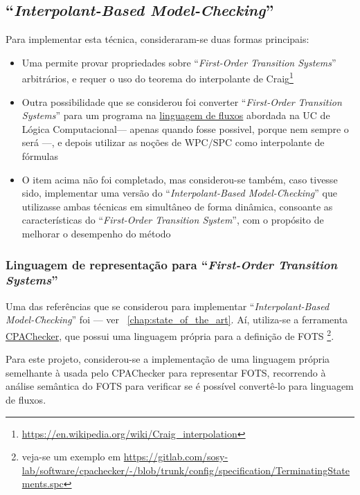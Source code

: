 \documentclass[11pt,a4paper]{report}%
\def\imc{``\textit{Interpolant-Based Model-Checking}''\xspace}
\def\fotss{``\textit{First-Order Transition Systems}''\xspace}
\def\fots{``\textit{First-Order Transition System}''\xspace}
\def\lc{Lógica Computacional}
\begin{document}
\subsection{\imc}

Para implementar esta técnica, consideraram-se duas formas principais:

\begin{itemize}
    \item Uma permite provar propriedades sobre \fotss arbitrários, e requer o uso do teorema do
    interpolante de Craig\footnote{\url{https://en.wikipedia.org/wiki/Craig_interpolation}}
    \item Outra possibilidade que se considerou foi converter \fotss para um programa na \href{https://paper.dropbox.com/doc/Capitulo-5-Verificacao-Formal-de-Software-e95D7fVpc0dArh4pnVl1l#:uid=965576973936347812020135&h2=Fluxos}{linguagem de fluxos} abordada na UC de \lc --- apenas quando fosse possivel, porque nem sempre o será ---, e depois
    utilizar as noções de \href{https://paper.dropbox.com/doc/Capitulo-5-Verificacao-Formal-de-Software-e95D7fVpc0dArh4pnVl1l#:uid=847823822173927851567448&h2=Denota\%C3\%A7\%C3\%A3o-WPC-e-sua-linguagem-}{$\text{WPC/SPC}$} como interpolante de fórmulas
    \item O item acima não foi completado, mas considerou-se também, caso tivesse sido, implementar uma
    versão do \imc que utilizasse ambas técnicas em simultâneo de forma dinâmica, consoante as características
    do \fots, com o propósito de melhorar o desempenho do método
\end{itemize}

\subsubsection{Linguagem de representação para \fotss}

Uma das referências que se considerou para implementar \imc foi \cite{interpolation1} --- ver ~\ref{chap:state_of_the_art}.
Aí, utiliza-se a ferramenta \href{https://cpachecker.sosy-lab.org/}{CPAChecker}, que possui uma linguagem
própria para a definição de FOTS \footnote{veja-se um exemplo em \url{https://gitlab.com/sosy-lab/software/cpachecker/-/blob/trunk/config/specification/TerminatingStatements.spc}}.

Para este projeto, considerou-se a implementação de uma linguagem própria semelhante à usada pelo CPAChecker
para representar FOTS, recorrendo à análise semântica do FOTS para verificar se é possível convertê-lo
para linguagem de fluxos.
\end{document}
